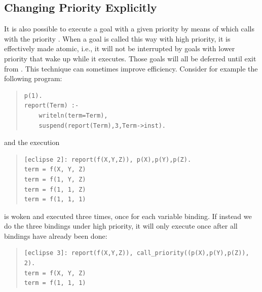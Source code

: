 \subsection{Changing Priority Explicitly}
It is also possible to execute a goal with a given priority
by means of
which calls  with the priority .
When a goal is called this way with high priority, it is effectively
made atomic, i.e., it will not be interrupted by goals with lower priority
that wake up while it executes.
Those goals will all be deferred until exit from
.
This technique can sometimes improve efficiency.
Consider for example the following program:
\begin{quote}
\begin{verbatim}
p(1).
report(Term) :-
    writeln(term=Term),
    suspend(report(Term),3,Term->inst).
\end{verbatim}
\end{quote}
and the execution
\begin{quote}
\begin{verbatim}
[eclipse 2]: report(f(X,Y,Z)), p(X),p(Y),p(Z).
term = f(X, Y, Z)
term = f(1, Y, Z)
term = f(1, 1, Z)
term = f(1, 1, 1)
\end{verbatim}
\end{quote}
 is woken and executed three times, once for each variable
binding.
If instead we do the three bindings under high priority, it will only
execute once after all bindings have already been done:
\begin{quote}
\begin{verbatim}
[eclipse 3]: report(f(X,Y,Z)), call_priority((p(X),p(Y),p(Z)), 2).
term = f(X, Y, Z)
term = f(1, 1, 1)
\end{verbatim}
\end{quote}


